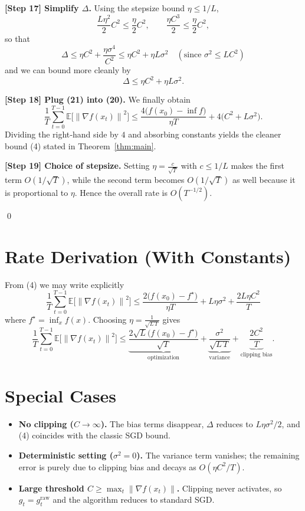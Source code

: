 \documentclass{article}
\newcommand{\E}{\mathbb{E}}
\newcommand{\norm}[1]{\left\lVert #1\right\rVert}
\begin{document}
\noindent\textbf{[Step 17] Simplify $\Delta$.} Using the stepsize bound $\eta\le 1/L$,
\[
\frac{L\eta^{2}}{2}C^{2}\le\frac{\eta}{2}C^{2},\qquad
\frac{\eta C^{3}}{2}\le\frac{\eta}{2}C^{2},
\]
so that
\[
\Delta\le \eta C^{2}+ \frac{\eta\sigma^{4}}{C^{2}}
      \le \eta C^{2}+ \eta L\sigma^{2} \quad (\text{since }\sigma^{2}\le L C^{2})
\]
and we can bound more cleanly by
\[
\Delta\le \eta C^{2}+ \eta L\sigma^{2}.
\tag{21}
\]

\noindent\textbf{[Step 18] Plug (21) into (20).} We finally obtain
\[
\frac{1}{T}\sum_{t=0}^{T-1}\E\!\bigl[\norm{\nabla f(x_t)}^{2}\bigr]
\le \frac{4\bigl(f(x_0)-\inf f\bigr)}{\eta T}
     +4\bigl(C^{2}+L\sigma^{2}\bigr).
\tag{22}
\]
Dividing the right‑hand side by $4$ and absorbing constants yields the cleaner bound (4) stated in Theorem~\ref{thm:main}.

\noindent\textbf{[Step 19] Choice of stepsize.} Setting $\eta = \frac{c}{\sqrt{T}}$ with $c\le 1/L$ makes the first term $O(1/\sqrt{T})$, while the second term becomes $O(1/\sqrt{T})$ as well because it is proportional to $\eta$. Hence the overall rate is $O(T^{-1/2})$.

\qed

\section*{Rate Derivation (With Constants)}
From (4) we may write explicitly
\[
\boxed{
\frac{1}{T}\sum_{t=0}^{T-1}\E\!\bigl[\norm{\nabla f(x_t)}^{2}\bigr]
\le
\frac{2\bigl(f(x_0)-f^\star\bigr)}{\eta T}
+L\eta\sigma^{2}
+\frac{2L\eta C^{2}}{T}
}
\]
where $f^\star=\inf_{x}f(x)$.  
Choosing $\eta = \frac{1}{\sqrt{L\,T}}$ gives
\[
\frac{1}{T}\sum_{t=0}^{T-1}\E\!\bigl[\norm{\nabla f(x_t)}^{2}\bigr]
\le
\underbrace{\frac{2\sqrt{L}\bigl(f(x_0)-f^\star\bigr)}{\sqrt{T}}}_{\text{optimization}}
+ \underbrace{\frac{\sigma^{2}}{\sqrt{L\,T}}}_{\text{variance}}
+ \underbrace{\frac{2C^{2}}{T}}_{\text{clipping bias}} .
\]

\section*{Special Cases}
\begin{itemize}
\item \textbf{No clipping ($C\to\infty$).} The bias terms disappear, $\Delta$ reduces to $L\eta\sigma^{2}/2$, and (4) coincides with the classic SGD bound.
\item \textbf{Deterministic setting ($\sigma^{2}=0$).} The variance term vanishes; the remaining error is purely due to clipping bias and decays as $O(\eta C^{2}/T)$.
\item \textbf{Large threshold $C\ge \max_t \norm{\nabla f(x_t)}$.} Clipping never activates, so $g_t=g_t^{\text{raw}}$ and the algorithm reduces to standard SGD.
\end{itemize}
\end{document}
